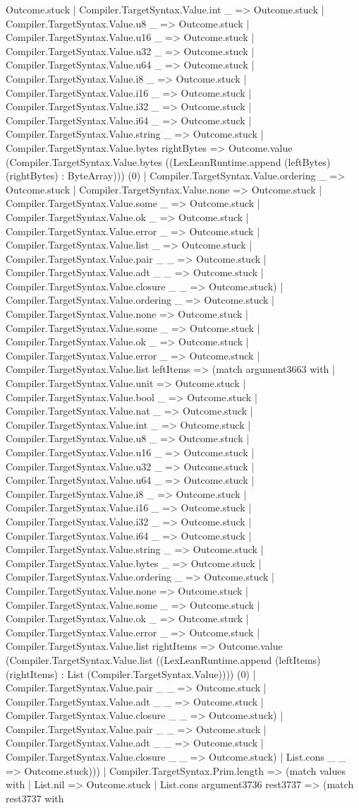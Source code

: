 \documentclass[11pt]{article}
\begin{document}
Outcome.stuck | Compiler.TargetSyntax.Value.int \_ => Outcome.stuck | Compiler.TargetSyntax.Value.u8 \_ => Outcome.stuck | Compiler.TargetSyntax.Value.u16 \_ => Outcome.stuck | Compiler.TargetSyntax.Value.u32 \_ => Outcome.stuck | Compiler.TargetSyntax.Value.u64 \_ => Outcome.stuck | Compiler.TargetSyntax.Value.i8 \_ => Outcome.stuck | Compiler.TargetSyntax.Value.i16 \_ => Outcome.stuck | Compiler.TargetSyntax.Value.i32 \_ => Outcome.stuck | Compiler.TargetSyntax.Value.i64 \_ => Outcome.stuck | Compiler.TargetSyntax.Value.string \_ => Outcome.stuck | Compiler.TargetSyntax.Value.bytes rightBytes => Outcome.value (Compiler.TargetSyntax.Value.bytes ((LexLeanRuntime.append (leftBytes) (rightBytes) : ByteArray))) (0) | Compiler.TargetSyntax.Value.ordering \_ => Outcome.stuck | Compiler.TargetSyntax.Value.none => Outcome.stuck | Compiler.TargetSyntax.Value.some \_ => Outcome.stuck | Compiler.TargetSyntax.Value.ok \_ => Outcome.stuck | Compiler.TargetSyntax.Value.error \_ => Outcome.stuck | Compiler.TargetSyntax.Value.list \_ => Outcome.stuck | Compiler.TargetSyntax.Value.pair \_ \_ => Outcome.stuck | Compiler.TargetSyntax.Value.adt \_ \_ => Outcome.stuck | Compiler.TargetSyntax.Value.closure \_ \_ => Outcome.stuck) | Compiler.TargetSyntax.Value.ordering \_ => Outcome.stuck | Compiler.TargetSyntax.Value.none => Outcome.stuck | Compiler.TargetSyntax.Value.some \_ => Outcome.stuck | Compiler.TargetSyntax.Value.ok \_ => Outcome.stuck | Compiler.TargetSyntax.Value.error \_ => Outcome.stuck | Compiler.TargetSyntax.Value.list leftItems => (match argument3663 with | Compiler.TargetSyntax.Value.unit => Outcome.stuck | Compiler.TargetSyntax.Value.bool \_ => Outcome.stuck | Compiler.TargetSyntax.Value.nat \_ => Outcome.stuck | Compiler.TargetSyntax.Value.int \_ => Outcome.stuck | Compiler.TargetSyntax.Value.u8 \_ => Outcome.stuck | Compiler.TargetSyntax.Value.u16 \_ => Outcome.stuck | Compiler.TargetSyntax.Value.u32 \_ => Outcome.stuck | Compiler.TargetSyntax.Value.u64 \_ => Outcome.stuck | Compiler.TargetSyntax.Value.i8 \_ => Outcome.stuck | Compiler.TargetSyntax.Value.i16 \_ => Outcome.stuck | Compiler.TargetSyntax.Value.i32 \_ => Outcome.stuck | Compiler.TargetSyntax.Value.i64 \_ => Outcome.stuck | Compiler.TargetSyntax.Value.string \_ => Outcome.stuck | Compiler.TargetSyntax.Value.bytes \_ => Outcome.stuck | Compiler.TargetSyntax.Value.ordering \_ => Outcome.stuck | Compiler.TargetSyntax.Value.none => Outcome.stuck | Compiler.TargetSyntax.Value.some \_ => Outcome.stuck | Compiler.TargetSyntax.Value.ok \_ => Outcome.stuck | Compiler.TargetSyntax.Value.error \_ => Outcome.stuck | Compiler.TargetSyntax.Value.list rightItems => Outcome.value (Compiler.TargetSyntax.Value.list ((LexLeanRuntime.append (leftItems) (rightItems) : List (Compiler.TargetSyntax.Value)))) (0) | Compiler.TargetSyntax.Value.pair \_ \_ => Outcome.stuck | Compiler.TargetSyntax.Value.adt \_ \_ => Outcome.stuck | Compiler.TargetSyntax.Value.closure \_ \_ => Outcome.stuck) | Compiler.TargetSyntax.Value.pair \_ \_ => Outcome.stuck | Compiler.TargetSyntax.Value.adt \_ \_ => Outcome.stuck | Compiler.TargetSyntax.Value.closure \_ \_ => Outcome.stuck) | List.cons \_ \_ => Outcome.stuck))) | Compiler.TargetSyntax.Prim.length => (match values with | List.nil => Outcome.stuck | List.cons argument3736 rest3737 => (match rest3737 with 
\end{document}
